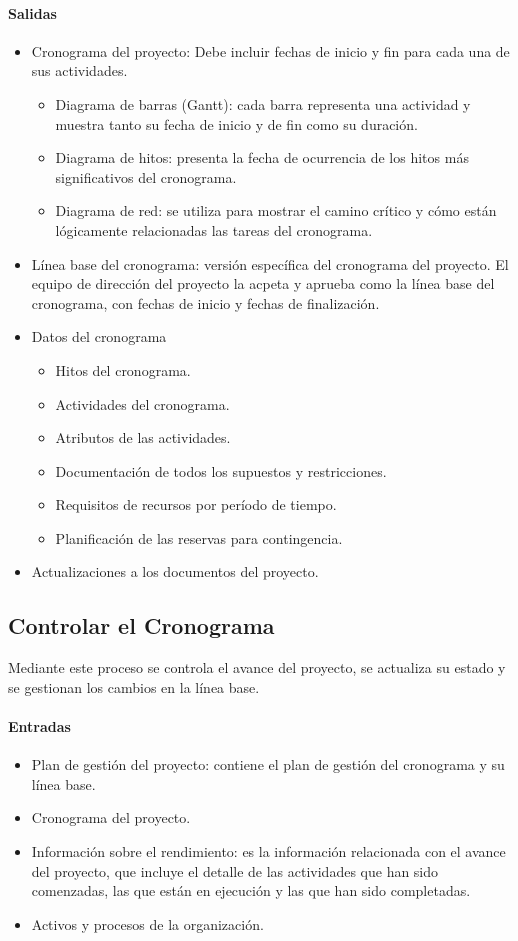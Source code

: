 \documentclass[a4paper,twosides]{article}
\newlength{\wideitemsep}
\let\olditem\item
\renewcommand{\item}{\setlength{\itemsep}{\wideitemsep}\olditem}
\begin{document}
\paragraph{Salidas}
\begin{itemize}
\item Cronograma del proyecto: Debe incluir fechas de inicio y fin para cada una de sus actividades.
\begin{itemize}
\item Diagrama de barras (Gantt): cada barra representa una actividad y muestra tanto su fecha de inicio y de fin como su duración.
\item Diagrama de hitos: presenta la fecha de ocurrencia de los hitos más significativos del cronograma.
\item Diagrama de red: se utiliza para mostrar el camino crítico y cómo están lógicamente relacionadas las tareas del cronograma.
\end{itemize}
\item Línea base del cronograma: versión específica del cronograma del proyecto. El equipo de dirección del proyecto la acpeta y aprueba como la línea base del cronograma, con fechas de inicio y fechas de finalización.
\item Datos del cronograma
\begin{itemize}
\item Hitos del cronograma.
\item Actividades del cronograma.
\item Atributos de las actividades.
\item Documentación de todos los supuestos y restricciones.
\item Requisitos de recursos por período de tiempo.
\item Planificación de las reservas para contingencia.
\end{itemize}
\item Actualizaciones a los documentos del proyecto.
\end{itemize}

\subsection{Controlar el Cronograma} \label{sec:controlar_cronograma}
Mediante este proceso se controla el avance del proyecto, se actualiza su estado y se gestionan los cambios en la línea base.

\paragraph{Entradas}
\begin{itemize}
\item Plan de gestión del proyecto: contiene el plan de gestión del cronograma y su línea base.
\item Cronograma del proyecto.
\item Información sobre el rendimiento: es la información relacionada con el avance del proyecto, que incluye el detalle de las actividades que han sido comenzadas, las que están en ejecución y las que han sido completadas.
\item Activos y procesos de la organización.
\end{itemize}
\end{document}
